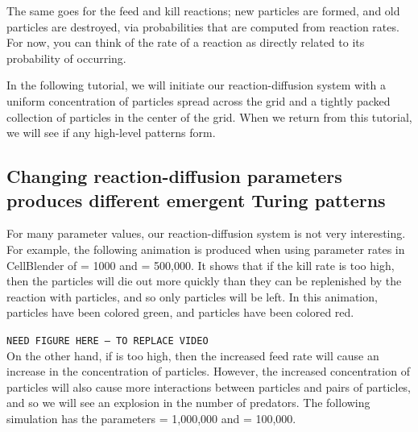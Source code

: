 {\begin{qbox}\end{qbox}

The same goes for the feed and kill reactions; new  particles are formed, and old  particles are destroyed, via probabilities that are computed from reaction rates. For now, you can think of the rate of a reaction as directly related to its probability of occurring.

In the following tutorial, we will initiate our reaction-diffusion system with a uniform concentration of  particles spread across the grid and a tightly packed collection of  particles in the center of the grid. When we return from this tutorial, we will see if any high-level patterns form.


\FloatBarrier
{}
\subsection{Changing reaction-diffusion parameters produces different emergent Turing patterns}

For many parameter values, our reaction-diffusion system is not very interesting.  For example, the following animation is produced when using parameter rates in CellBlender of  = 1000 and  = 500,000.  It shows that if the kill rate is too high, then the  particles will die out more quickly than they can be replenished by the reaction with  particles, and so only  particles will be left. In this animation,  particles have been colored green, and  particles have been colored red.

\texttt{NEED FIGURE HERE -- TO REPLACE VIDEO}\\

On the other hand, if  is too high, then the increased feed rate will cause an increase in the concentration of  particles. However, the increased concentration of  particles will also cause more interactions between  particles and pairs of  particles, and so we will see an explosion in the number of predators. The following simulation has the parameters  = 1,000,000 and  = 100,000.

}
